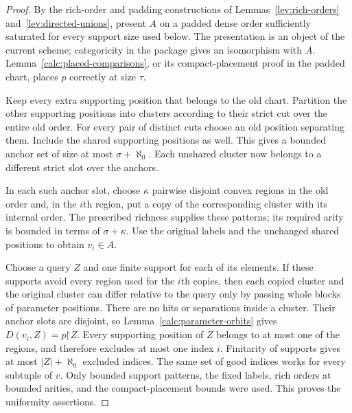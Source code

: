 \begin{proof}
By the rich-order and padding constructions of
Lemmas~\ref{lev:rich-orders} and~\ref{lev:directed-unions}, present $A$
on a padded dense order sufficiently saturated for every support size
used below.  The presentation is an object of the current scheme;
categoricity in the package gives an isomorphism with $A$.
Lemma~\ref{calc:placed-comparisons}, or its compact-placement proof in
the padded chart, places $p$ correctly at size $\tau$.

Keep every extra supporting position that belongs to the old chart.
Partition the other supporting positions into clusters according to
their strict cut over the entire old order.  For every pair of distinct
cuts choose an old position separating them.  Include the shared
supporting positions as well.  This gives a bounded anchor set of size
at most $\sigma+\aleph_0$.  Each unshared cluster now belongs to a
different strict slot over the anchors.

In each such anchor slot, choose $\kappa$ pairwise disjoint convex
regions in the old order and, in the $i$th region, put a copy of the
corresponding cluster with its internal order.  The prescribed
richness supplies these patterns; its required arity is bounded in
terms of $\sigma+\kappa$.  Use the original labels and the unchanged
shared positions to obtain $v_i\in A$.

Choose a query $Z$ and one finite support for each of its elements.
If these supports avoid every region used for the $i$th copies, then
each copied cluster and the original cluster can differ relative to
the query only by passing whole blocks of parameter positions.  There
are no hits or separations inside a cluster.  Their anchor slots are
disjoint, so Lemma~\ref{calc:parameter-orbits} gives
$D(v_i,Z)=p\mathord\upharpoonright Z$.  Every supporting position of
$Z$ belongs to at most one of the regions, and therefore excludes at
most one index $i$.  Finitarity of supports gives at most
$|Z|+\aleph_0$ excluded indices.  The same set of good indices works
for every subtuple of $v$.  Only bounded support patterns, the fixed
labels, rich orders at bounded arities, and the compact-placement
bounds were used.  This proves the uniformity assertions.
\end{proof}

